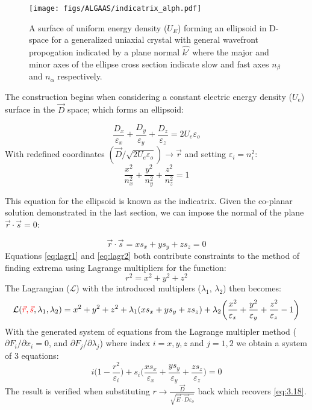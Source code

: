 \begin{figure}[ht!]
\begin{center}
\texttt{[image: figs/ALGAAS/indicatrix\_alph.pdf]}
\end{center}
\caption{A surface of uniform energy density ($U_E$) forming an ellipsoid in D-space for a generalized uniaxial crystal with general wavefront propogation indicated by a plane normal $\hat{k'}$ where the major and minor axes of the ellipse cross section indicate slow and fast axes $n_\beta$ and $n_\alpha$ respectively.}
\label{fig:general_indicatrix}
\end{figure}

The construction begins when considering a constant electric energy density ($U_e$) surface in the $\vec{D}$ space; which forms an ellipsoid: 

\begin{equation}\label{eq:lagr1}
\frac{D_x}{\varepsilon_x} + \frac{D_y}{\varepsilon_y} + \frac{D_z}{\varepsilon_z} = 2 U_e \varepsilon_o
\end{equation}
With redefined coordinates $(\vec{D}/\sqrt{2 U_e \varepsilon_o}) \rightarrow \vec{r}$ and setting $\varepsilon_i = n^2_i$:
\begin{equation}
\frac{x^2}{n_x^2} + \frac{y^2}{n_y^2} + \frac{z^2}{n_z^2} = 1
\end{equation}

This equation for the ellipsoid is known as the indicatrix. Given the co-planar solution demonstrated in the last section, we can impose the normal of the plane $\vec{r} \cdot \vec{s} = 0$:

\begin{equation}\label{eq:lagr2}
\vec{r} \cdot \vec{s} = x s_x + y s_y + z s_z = 0
\end{equation}
Equations \ref{eq:lagr1} and \ref{eq:lagr2} both contribute constraints to the method of finding extrema using Lagrange multipliers for the function:
\begin{equation}
r^2 = x^2 + y^2 + z^2
\end{equation}
The Lagrangian ($\mathcal{L}$) with the introduced multiplers ($\lambda_1$, $\lambda_2$) then becomes:
\begin{equation}
\mathcal{L}(\textcolor{red}{\vec{r},\vec{s}},\lambda_1, \lambda_2) =
x^2 + y^2 + z^2 + \lambda_1 (xs_x + ys_y + zs_z) + \lambda_2 \bigg( \frac{x^2}{\varepsilon_x} + \frac{y^2}{\varepsilon_y} + \frac{z^2}{\varepsilon_z} - 1 \bigg)
\end{equation}
With the generated system of equations from the Lagrange multipler method ($\partial F_i/ \partial x_i = 0$, and $\partial F_j/ \partial \lambda_j$) where index $i =x,y,z$ and $j = 1,2$ we obtain a system of 3 equations:
\begin{equation}
i \bigg(1-\frac{r^2}{\varepsilon_{i}} \bigg) + s_{i} \bigg(\frac{x s_x}{\varepsilon_x} + \frac{y s_y}{\varepsilon_y} + \frac{z s_z}{\varepsilon_z} \bigg) = 0
\end{equation}
The result is verified when substituting $r \rightarrow \frac{\vec{D}}{\sqrt{\vec{E} \cdot \vec{D} \varepsilon_o}}$ back which recovers \ref{eq:3.18}.
\\

